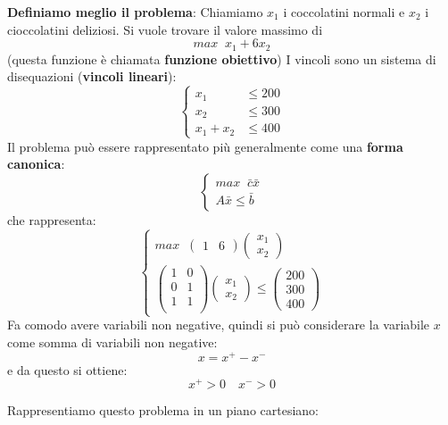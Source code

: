 \documentclass[a4paper]{article}
\begin{document}
\begin{example}
  \vspace{1em}
  \noindent
  \textbf{Definiamo meglio il problema}:
  Chiamiamo \( x_1 \) i coccolatini normali e \( x_2 \) i cioccolatini deliziosi. Si vuole
  trovare il valore massimo di
  \[
    max \;\; x_1 + 6 x_2
  \]
  (questa funzione è chiamata \textbf{funzione obiettivo})
  I vincoli sono un sistema di disequazioni (\textbf{vincoli lineari}):
  \[
    \begin{cases}
      x_1 & \le 200\\
      x_2 & \le 300\\
      x_1 + x_2 &\le 400
    \end{cases}
  \] 
  Il problema può essere rappresentato più generalmente come una \textbf{forma canonica}:
  \[
    \begin{cases}
      max \;\; \bar{c} \bar{x}\\
      A \bar{x} \le \bar{b}
    \end{cases}
  \] 
  che rappresenta:
  \[
    \begin{cases}
      max \;\; \begin{pmatrix} 1 & 6 \end{pmatrix} \begin{pmatrix} x_1 \\ x_2 \end{pmatrix} \\
      \begin{pmatrix} 
        1 & 0 \\
        0 & 1 \\
        1 & 1 \\
      \end{pmatrix} 
      \begin{pmatrix} x_1 \\ x_2 \end{pmatrix} 
      \le 
      \begin{pmatrix} 200 \\ 300 \\ 400 \end{pmatrix} 
    \end{cases}
  \] 
  Fa comodo avere variabili non negative, quindi si può considerare la variabile \( x \)
  come somma di variabili non negative:
  \[
    x = x^+ - x^-
  \] 
  e da questo si ottiene:
  \[
    x^+ > 0 \quad x^- > 0
  \] 
  
  \vspace{1em}
  \noindent
  Rappresentiamo questo problema in un piano cartesiano:
  \begin{figure}[H]
    \centering
\end{figure}
\end{example}
\end{document}
